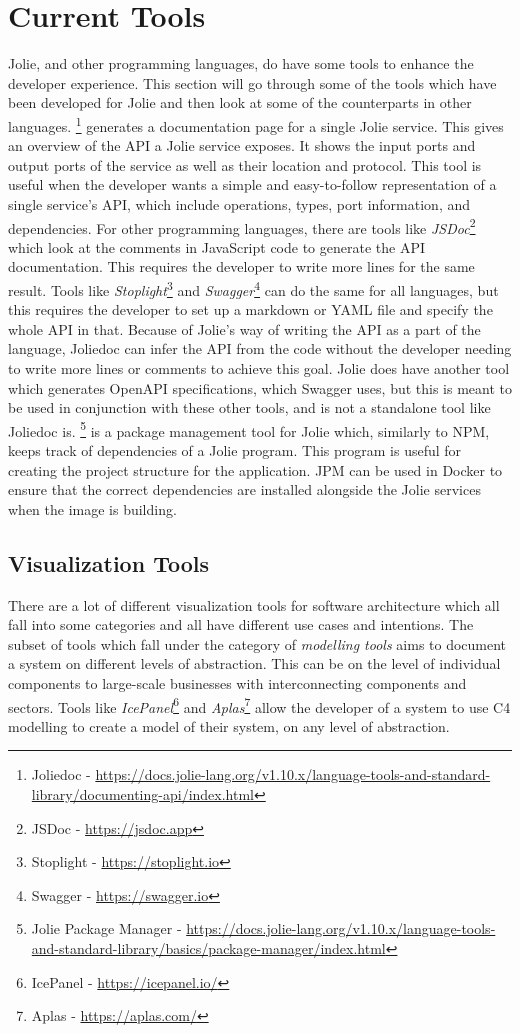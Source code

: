 \section{Current Tools}
Jolie, and other programming languages, do have some tools to enhance the developer experience. This section will go through some of the tools
which have been developed for Jolie and then look at some of the counterparts in other languages.
%
\footnote{Joliedoc - \url{https://docs.jolie-lang.org/v1.10.x/language-tools-and-standard-library/documenting-api/index.html}} generates a documentation page for a single Jolie service. This gives an overview of the API a Jolie service exposes. It shows the input ports and output ports of the service as well as their location and protocol.
This tool is useful when the developer wants a simple and easy-to-follow representation of a single service's API, which include operations, types, port information, and dependencies.
For other programming languages, there are tools like \emph{JSDoc}\footnote{JSDoc - \url{https://jsdoc.app}} which look at the comments in JavaScript code to generate the API documentation. This requires the developer to write more lines for the same result.
Tools like \emph{Stoplight}\footnote{Stoplight - \url{https://stoplight.io}} and \emph{Swagger}\footnote{Swagger - \url{https://swagger.io}} can do the same for all languages, but this requires the developer to set up a markdown or YAML file and specify the whole API in that.
Because of Jolie's way of writing the API as a part of the language, Joliedoc can infer the API from the code without the developer needing to write more lines or comments to achieve this goal.
Jolie does have another tool which generates OpenAPI specifications, which Swagger uses, but this is meant to be used in conjunction with these other tools, and is not a standalone tool like Joliedoc is.
%
\footnote{Jolie Package Manager - \url{https://docs.jolie-lang.org/v1.10.x/language-tools-and-standard-library/basics/package-manager/index.html}} is a package management tool for Jolie which, similarly to NPM, keeps track of dependencies of a Jolie program.
This program is useful for creating the project structure for the application. JPM can be used in Docker to ensure that the correct dependencies are installed alongside the Jolie services when the image is building.

\subsection{Visualization Tools}
There are a lot of different visualization tools for software architecture which all fall into some categories and all have different use cases and intentions.
The subset of tools which fall under the category of \emph{modelling tools} aims to document a system on different levels of abstraction. This can be on the level of individual components to large-scale businesses with interconnecting components and sectors.
Tools like \emph{IcePanel}\footnote{IcePanel - \url{https://icepanel.io/}} and \emph{Aplas}\footnote{Aplas - \url{https://aplas.com/}} allow the developer of a system to use C4 modelling to create a model of their system, on any level of abstraction.

